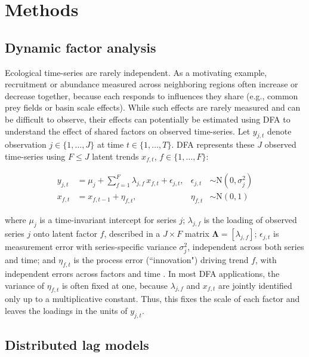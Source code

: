 \documentclass[12pt]{article}
\begin{document}
\section{Methods}
\label{sec:methods}

\subsection{Dynamic factor analysis}

Ecological time-series are rarely independent. As a motivating example,
recruitment or abundance measured across neighboring regions often
increase or decrease together, because each responds to influences they
share (e.g., common prey fields or basin scale effects). While such
effects are rarely measured and can be difficult to observe, their
effects can potentially be estimated using DFA to understand the effect
of shared factors on observed time-series. Let $y_{j,t}$ denote
observation $j \in \{1,\dots,J\}$ at time $t \in \{1,\dots,T\}$. DFA
represents these $J$ observed time-series using $F \le J$ latent trends
$x_{f,t}$, $f \in \{1,\dots,F\}$:

\begin{align}
  y_{j,t} &= \mu_j + \sum_{f=1}^{F} \lambda_{j,f}\, x_{f,t}
             + \epsilon_{j,t},
  &\epsilon_{j,t} &\sim \mathrm{N}\!\left(0, \sigma_j^2\right)
  \label{eq:dfa-obs} \\
  x_{f,t} &= x_{f,t-1} + \eta_{f,t},
  &\eta_{f,t} &\sim \mathrm{N}\!\left(0, 1\right)
  \label{eq:dfa-trend}
\end{align}

where $\mu_j$ is a time-invariant intercept for series $j$;
$\lambda_{j,f}$ is the loading of observed series $j$ onto latent factor
$f$, described in a $J \times F$ matrix $\boldsymbol\Lambda =
[\lambda_{j,f}]$; $\epsilon_{j,t}$ is measurement error with
series-specific variance $\sigma_j^2$, independent across both series
and time; and $\eta_{f,t}$ is the process error (``innovation") driving
trend $f$, with independent errors across factors and time
\citep{zuur_estimating_2003,zuur_dynamic_2003}. In most DFA
applications, the variance of $\eta_{f,t}$ is often fixed at one,
because $\lambda_{j,f}$ and $x_{f,t}$ are jointly identified only up to
a multiplicative constant. Thus, this fixes the scale of each factor and
leaves the loadings in the units of $y_{j,t}$.

\subsection{Distributed lag models}
\end{document}
